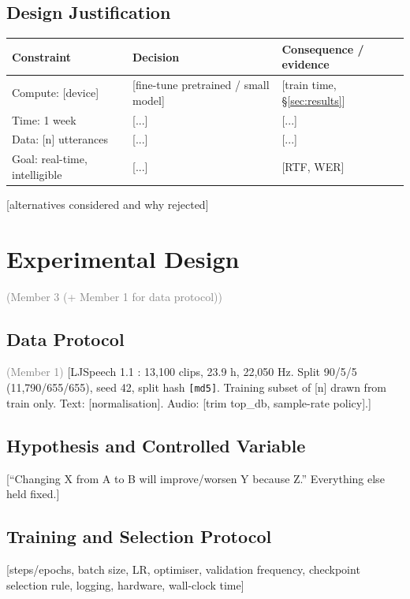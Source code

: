\documentclass[11pt,a4paper]{article}
\newcommand{\ph}[1]{\colorbox{red!12}{\textcolor{red!70!black}{\small\textsf{[#1]}}}}
\newcommand{\owner}[1]{\hfill{\small\textcolor{gray}{(#1)}}}
\begin{document}
\subsection{Design Justification}
\begin{tabularx}{\linewidth}{@{}lXX@{}}
\toprule
Constraint & Decision & Consequence / evidence \\ \midrule
Compute: \ph{device} & \ph{fine-tune pretrained / small model} & \ph{train time, \S\ref{sec:results}} \\
Time: 1 week & \ph{...} & \ph{...} \\
Data: \ph{n} utterances & \ph{...} & \ph{...} \\
Goal: real-time, intelligible & \ph{...} & \ph{RTF, WER} \\ \bottomrule
\end{tabularx}

\noindent\ph{alternatives considered and why rejected}

\section{Experimental Design}\owner{Member 3 (+ Member 1 for data protocol)}
\subsection{Data Protocol}\owner{Member 1}
\ph{LJSpeech 1.1 \citep{ito2017ljspeech}: 13{,}100 clips, 23.9 h, 22{,}050 Hz. Split 90/5/5 (11{,}790/655/655), seed 42, split hash \texttt{\ph{md5}}. Training subset of \ph{n} drawn from train only. Text: \ph{normalisation}. Audio: \ph{trim top\_db, sample-rate policy}.}

\subsection{Hypothesis and Controlled Variable}
\ph{``Changing X from A to B will improve/worsen Y because Z.'' Everything else held fixed.}

\subsection{Training and Selection Protocol}
\ph{steps/epochs, batch size, LR, optimiser, validation frequency, checkpoint selection rule, logging, hardware, wall-clock time}
\end{document}
